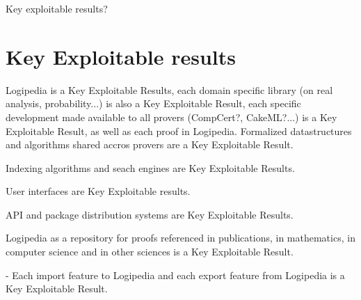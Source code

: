 {\color{red} Key exploitable results?}


\section{Key Exploitable results}

{\sf Logipedia} is a Key Exploitable Results, each domain specific library
(on real analysis, probability...) is also a Key Exploitable Result,
each specific development made available to all provers (CompCert?,
CakeML?...) is a Key Exploitable Result, as well as each proof in
{\sf Logipedia}. Formalized datastructures and algorithms shared accros
provers are a Key Exploitable Result.

Indexing algorithms and seach engines are Key Exploitable Results.

User interfaces are Key Exploitable results.

API and package distribution systems are Key Exploitable Results.

{\sf Logipedia} as a repository for proofs referenced in publications, 
in mathematics, in computer science and in other sciences is a
Key Exploitable Result.

- Each import feature to {\sf Logipedia} and each export
feature from {\sf Logipedia} is a 
Key Exploitable Result.

